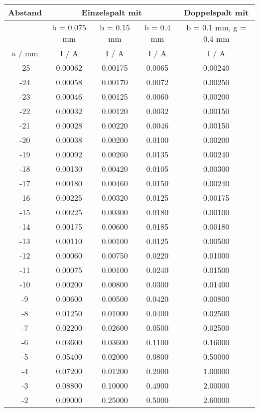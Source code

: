 \begin{table}
  \centering
  \begin{tabular}{c || c | c | c | c}
    \toprule
    Abstand & \multicolumn{3}{|c|}{Einzelspalt mit} & Doppelspalt mit \\
    \toprule
    & b = 0.075 mm & b = 0.15 mm & b = 0.4 mm & b = 0.1 mm, g = 0.4 mm \\
    a / mm & I /  A & I /  A & I /  A & I /  A \\
    \midrule
    -25	& 0.00062 & 0.00175 & 0.0065 & 0.00240 \\
    -24	& 0.00058 & 0.00170 & 0.0072 & 0.00250 \\
    -23	& 0.00046 & 0.00125 & 0.0060 & 0.00200 \\
    -22	& 0.00032 & 0.00120 & 0.0032 & 0.00150 \\
    -21	& 0.00028 & 0.00220 & 0.0046 & 0.00150 \\
    -20	& 0.00038 & 0.00200 & 0.0100 & 0.00200 \\
    -19	& 0.00092 & 0.00260 & 0.0135 & 0.00240 \\
    -18	& 0.00130 & 0.00420 & 0.0105 & 0.00300 \\
    -17	& 0.00180 & 0.00460 & 0.0150 & 0.00240 \\
    -16	& 0.00225 & 0.00320 & 0.0125 & 0.00175 \\
    -15	& 0.00225 & 0.00300 & 0.0180 & 0.00100 \\
    -14	& 0.00175 & 0.00600 & 0.0185 & 0.00180 \\
    -13	& 0.00110 & 0.00100 & 0.0125 & 0.00500 \\
    -12	& 0.00060 & 0.00750 & 0.0220 & 0.01000 \\
    -11	& 0.00075 & 0.00100 & 0.0240 & 0.01500 \\
    -10	& 0.00200 & 0.00800 & 0.0300 & 0.01400 \\
    -9	& 0.00600 & 0.00500 & 0.0420 & 0.00800 \\
    -8	& 0.01250 & 0.01000 & 0.0400 & 0.02500 \\
    -7	& 0.02200 & 0.02600 & 0.0500 & 0.02500 \\
    -6	& 0.03600 & 0.03600 & 0.1100 & 0.16000 \\
    -5	& 0.05400 & 0.02000 & 0.0800 & 0.50000 \\
    -4	& 0.07200 & 0.01200 & 0.2000 & 1.00000 \\
    -3	& 0.08800 & 0.10000 & 0.4900 & 2.00000 \\
    -2	& 0.09000 & 0.25000 & 0.5000 & 2.60000 \\

\end{tabular}
\end{table}
